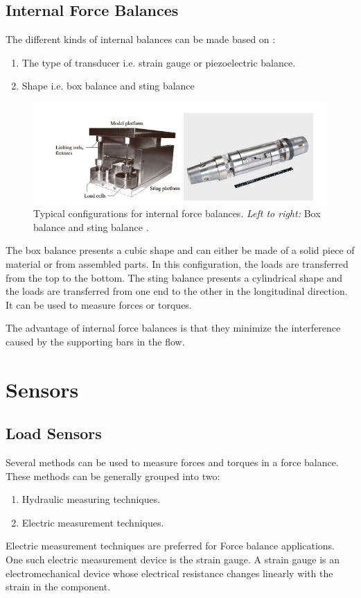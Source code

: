 \subsection{Internal Force Balances}
The different kinds of internal balances can be made based on \cite{ferreira2015design}:
\begin{enumerate}
\item The type of transducer i.e. strain gauge or piezoelectric balance.
\item Shape i.e. box balance and sting balance
\end{enumerate} 
\begin{center}
	\begin{figure}[H]
	\centering
	\includegraphics[width=0.8\linewidth]{Figures/Fig7}
	\caption[Internal force balances]{Typical configurations for internal force balances. \textit{Left to right:} Box balance and sting balance \cite{ferreira2015design}.}
	\end{figure}
\end{center}
The box balance presents a cubic shape and can either be made of a solid piece of material or from assembled parts. In this configuration, the loads are transferred from the top to the bottom. The sting balance presents a cylindrical shape and the loads are transferred from one end to the other in the longitudinal direction. It can be used to measure forces or torques.

The advantage of internal force balances is that they minimize the interference caused by the supporting bars in the flow.
\section{Sensors}
\subsection{Load Sensors}
Several methods can be used to measure forces and torques in a force balance. These methods can be generally grouped into two\cite{ferreira2015design}:
\begin{enumerate}
\item Hydraulic measuring techniques.
\item Electric measurement techniques.
\end{enumerate}
Electric measurement techniques are preferred for Force balance applications. One such electric measurement device is the strain gauge. A strain gauge is an electromechanical device whose electrical resistance changes linearly with the strain in the component.

